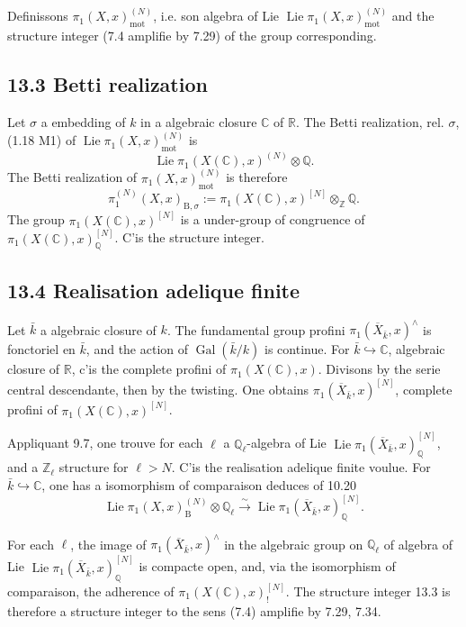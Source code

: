 \documentclass[12pt,a4paper]{article}
\theoremstyle{plain}
\theoremstyle{definition}
\theoremstyle{remark}
\DeclareMathOperator{\Lie}{Lie}
\DeclareMathOperator{\Gal}{Gal}
\newcommand{\bZ}{\mathbb{Z}}
\newcommand{\bQ}{\mathbb{Q}}
\newcommand{\bR}{\mathbb{R}}
\newcommand{\bC}{\mathbb{C}}
\newcommand{\B}{\mathrm{B}}
\newcommand{\mot}{\mathrm{mot}}
\begin{document}
Definissons $\pi_1(X,x)_{\mot}^{(N)}$, i.e. son algebra of Lie $\Lie \pi_1(X,x)_{\mot}^{(N)}$ and the structure integer (7.4 amplifie by 7.29) of the group corresponding.

\subsection*{13.3 Betti realization}

Let $\sigma$ a embedding of $k$ in a algebraic closure $\bC$ of $\bR$. The Betti realization, rel. $\sigma$, (1.18 M1) of $\Lie \pi_1(X,x)_{\mot}^{(N)}$ is
\begin{equation}\label{eq:13.3.1}
\Lie \pi_1(X(\bC), x)^{(N)} \otimes \bQ.
\end{equation}
The Betti realization of $\pi_1(X,x)_{\mot}^{(N)}$ is therefore
\begin{equation}\label{eq:13.3.2}
\pi_1^{(N)}(X,x)_{\B,\sigma} := \pi_1(X(\bC), x)^{[N]} \otimes_{\bZ} \bQ.
\end{equation}
The group $\pi_1(X(\bC), x)^{[N]}$ is a under-group of congruence of $\pi_1(X(\bC), x)^{[N]}_{\bQ}$. C'is the structure integer.

\subsection*{13.4 Realisation adelique finite}

Let $\bar{k}$ a algebraic closure of $k$. The fundamental group profini $\pi_1(\overline{X}_{\bar{k}}, x)^\wedge$ is fonctoriel en $\bar{k}$, and the action of $\Gal(\bar{k}/k)$ is continue. For $\bar{k} \hookrightarrow \bC$, algebraic closure of $\bR$, c'is the complete profini of $\pi_1(X(\bC), x)$. Divisons by the serie central descendante, then by the twisting. One obtains $\pi_1(\overline{X}_{\bar{k}}, x)^{[N]}$, complete profini of $\pi_1(X(\bC), x)^{[N]}$.

Appliquant 9.7, one trouve for each $\ell$ a $\bQ_\ell$-algebra of Lie $\Lie \pi_1(\overline{X}_{\bar{k}}, x)_{\bQ}^{[N]}$, and a $\bZ_\ell$ structure for $\ell > N$. C'is the realisation adelique finite voulue. For $\bar{k} \hookrightarrow \bC$, one has a isomorphism of comparaison deduces of 10.20
\[
\Lie \pi_1(X,x)_{\B}^{(N)} \otimes \bQ_\ell \xrightarrow{\sim} \Lie \pi_1(\overline{X}_{\bar{k}}, x)_{\bQ}^{[N]}.
\]

For each $\ell$, the image of $\pi_1(\overline{X}_{\bar{k}}, x)^\wedge$ in the algebraic group on $\bQ_\ell$ of algebra of Lie $\Lie \pi_1(\overline{X}_{\bar{k}}, x)_{\bQ}^{[N]}$ is compacte open, and, via the isomorphism of comparaison, the adherence of $\pi_1(X(\bC), x)_{!}^{[N]}$. The structure integer 13.3 is therefore a structure integer to the sens (7.4) amplifie by 7.29, 7.34.
\end{document}
